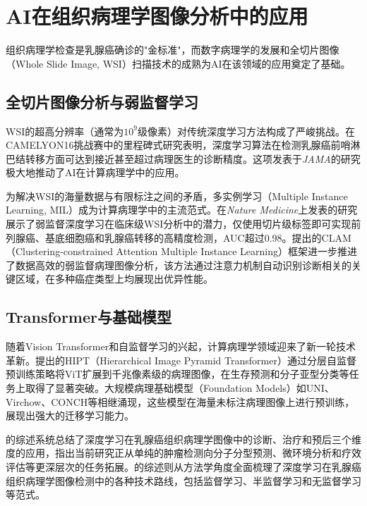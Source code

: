 \documentclass[12pt,a4paper]{article}
\begin{document}
\section{AI在组织病理学图像分析中的应用}

组织病理学检查是乳腺癌确诊的"金标准"，而数字病理学的发展和全切片图像（Whole Slide Image, WSI）扫描技术的成熟为AI在该领域的应用奠定了基础。

\subsection{全切片图像分析与弱监督学习}

WSI的超高分辨率（通常为$10^9$级像素）对传统深度学习方法构成了严峻挑战。\citet{bejnordi2017diagnostic}在CAMELYON16挑战赛中的里程碑式研究表明，深度学习算法在检测乳腺癌前哨淋巴结转移方面可达到接近甚至超过病理医生的诊断精度。这项发表于\textit{JAMA}的研究极大地推动了AI在计算病理学中的应用。

为解决WSI的海量数据与有限标注之间的矛盾，多实例学习（Multiple Instance Learning, MIL）成为计算病理学中的主流范式。\citet{campanella2019clinical}在\textit{Nature Medicine}上发表的研究展示了弱监督深度学习在临床级WSI分析中的潜力，仅使用切片级标签即可实现前列腺癌、基底细胞癌和乳腺癌转移的高精度检测，AUC超过0.98。\citet{lu2021data}提出的CLAM（Clustering-constrained Attention Multiple Instance Learning）框架进一步推进了数据高效的弱监督病理图像分析，该方法通过注意力机制自动识别诊断相关的关键区域，在多种癌症类型上均展现出优异性能。

\subsection{Transformer与基础模型}

随着Vision Transformer\citep{dosovitskiy2021image}和自监督学习的兴起，计算病理学领域迎来了新一轮技术革新。\citet{chen2022scaling}提出的HIPT（Hierarchical Image Pyramid Transformer）通过分层自监督预训练策略将ViT扩展到千兆像素级的病理图像，在生存预测和分子亚型分类等任务上取得了显著突破。大规模病理基础模型（Foundation Models）如UNI、Virchow、CONCH等相继涌现，这些模型在海量未标注病理图像上进行预训练，展现出强大的迁移学习能力。

\citet{jiang2024deep}的综述系统总结了深度学习在乳腺癌组织病理学图像中的诊断、治疗和预后三个维度的应用，指出当前研究正从单纯的肿瘤检测向分子分型预测、微环境分析和疗效评估等更深层次的任务拓展。\citet{priya2024deep}的综述则从方法学角度全面梳理了深度学习在乳腺癌组织病理学图像检测中的各种技术路线，包括监督学习、半监督学习和无监督学习等范式。
\end{document}
